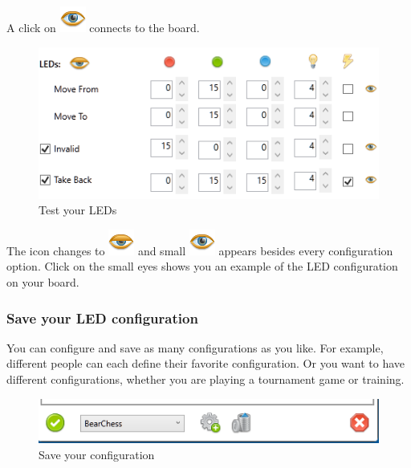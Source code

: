 \documentclass[11pt,a4paper]{article}
\begin{document}
A click on \includegraphics[scale=0.4]{eye.png} connects to the board.

\begin{figure}[H]
	\centering
	\includegraphics[scale=1.0]{iChessOne6.png}
	\caption{Test your LEDs }
	\label{fig:iChessOne9}
\end{figure}
The icon changes to \includegraphics[scale=0.4]{eye_half.png} and small \includegraphics[scale=0.3]{eye.png} appears besides every configuration option. Click on the small eyes shows you an example of the LED configuration on your board.

\subsubsection{Save your LED configuration}
You can configure and save as many configurations as you like. For example, different people can each define their favorite configuration. Or you want to have different configurations, whether you are playing a tournament game or training.

\begin{figure}[H]
	\centering
	\includegraphics[scale=1.0]{iChessOne7.png}
	\caption{Save your configuration}
	\label{fig:iChessOne10}
\end{figure}
\end{document}
